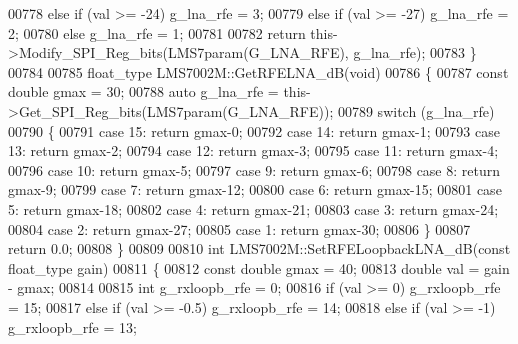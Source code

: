 \begin{DoxyCode}
{{{{{{{{{{{{{{{{{{{{{{{{{00778     \textcolor{keywordflow}{else} \textcolor{keywordflow}{if} (val >= -24) g\_lna\_rfe = 3;
00779     \textcolor{keywordflow}{else} \textcolor{keywordflow}{if} (val >= -27) g\_lna\_rfe = 2;
00780     \textcolor{keywordflow}{else} g\_lna\_rfe = 1;
00781 
00782     \textcolor{keywordflow}{return} this->Modify_SPI_Reg_bits(LMS7param(G_LNA_RFE), g\_lna\_rfe);
00783 \}
00784 
00785 float_type LMS7002M::GetRFELNA_dB(\textcolor{keywordtype}{void})
00786 \{
00787     \textcolor{keyword}{const} \textcolor{keywordtype}{double} gmax = 30;
00788     \textcolor{keyword}{auto} g\_lna\_rfe = this->Get_SPI_Reg_bits(LMS7param(G_LNA_RFE));
00789     \textcolor{keywordflow}{switch} (g\_lna\_rfe)
00790     \{
00791     \textcolor{keywordflow}{case} 15: \textcolor{keywordflow}{return} gmax-0;
00792     \textcolor{keywordflow}{case} 14: \textcolor{keywordflow}{return} gmax-1;
00793     \textcolor{keywordflow}{case} 13: \textcolor{keywordflow}{return} gmax-2;
00794     \textcolor{keywordflow}{case} 12: \textcolor{keywordflow}{return} gmax-3;
00795     \textcolor{keywordflow}{case} 11: \textcolor{keywordflow}{return} gmax-4;
00796     \textcolor{keywordflow}{case} 10: \textcolor{keywordflow}{return} gmax-5;
00797     \textcolor{keywordflow}{case} 9: \textcolor{keywordflow}{return} gmax-6;
00798     \textcolor{keywordflow}{case} 8: \textcolor{keywordflow}{return} gmax-9;
00799     \textcolor{keywordflow}{case} 7: \textcolor{keywordflow}{return} gmax-12;
00800     \textcolor{keywordflow}{case} 6: \textcolor{keywordflow}{return} gmax-15;
00801     \textcolor{keywordflow}{case} 5: \textcolor{keywordflow}{return} gmax-18;
00802     \textcolor{keywordflow}{case} 4: \textcolor{keywordflow}{return} gmax-21;
00803     \textcolor{keywordflow}{case} 3: \textcolor{keywordflow}{return} gmax-24;
00804     \textcolor{keywordflow}{case} 2: \textcolor{keywordflow}{return} gmax-27;
00805     \textcolor{keywordflow}{case} 1: \textcolor{keywordflow}{return} gmax-30;
00806     \}
00807     \textcolor{keywordflow}{return} 0.0;
00808 \}
00809 
00810 \textcolor{keywordtype}{int} LMS7002M::SetRFELoopbackLNA_dB(\textcolor{keyword}{const} float_type gain)
00811 \{
00812     \textcolor{keyword}{const} \textcolor{keywordtype}{double} gmax = 40;
00813     \textcolor{keywordtype}{double} val = gain - gmax;
00814 
00815     \textcolor{keywordtype}{int} g\_rxloopb\_rfe = 0;
00816     \textcolor{keywordflow}{if} (val >= 0) g\_rxloopb\_rfe = 15;
00817     \textcolor{keywordflow}{else} \textcolor{keywordflow}{if} (val >= -0.5) g\_rxloopb\_rfe = 14;
00818     \textcolor{keywordflow}{else} \textcolor{keywordflow}{if} (val >= -1) g\_rxloopb\_rfe = 13;
}}}}}}}}}}}}}}}}}}}}}}}}}
\end{DoxyCode}
